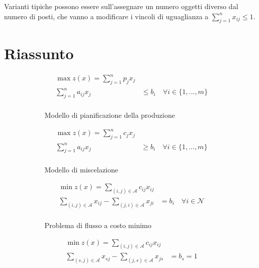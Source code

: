 \documentclass[\main/main.tex]{subfiles}
\begin{document}
Varianti tipiche possono essere sull'assegnare un numero oggetti diverso dal numero di posti, che vanno a modificare i vincoli di uguaglianza a $\sum_{j=1}^n x_{ij} \leq 1$.

\section{Riassunto}

\begin{figure}
	\begin{subfigure}{0.31\textwidth}
		\begin{align*}
			\max z(x) = \sum_{j=1}^n p_jx_j                                      \\
			\sum_{j=1}^n a_{ij}x_j & \leq b_i \quad \forall i \in \{1,\ldots,m\} \\
		\end{align*}
		\caption{Modello di pianificazione della produzione}
	\end{subfigure}
	\begin{subfigure}{0.31\textwidth}
		\begin{align*}
			\max z(x) = \sum_{j=1}^n c_jx_j                                      \\
			\sum_{j=1}^n a_{ij}x_j & \geq b_i \quad \forall i \in \{1,\ldots,m\} \\
		\end{align*}
		\caption{Modello di miscelazione}
	\end{subfigure}
	\begin{subfigure}{0.31\textwidth}
		\begin{align*}
			\min z(x) = \sum_{(i,j) \in \mathcal{A}} c_{ij}x_{ij}                                                             \\
			\sum_{(i,j) \in \mathcal{A}} x_{ij} - \sum_{(j,i) \in \mathcal{A}} x_{ji} & = b_i \quad \forall i \in \mathcal{N} \\
		\end{align*}
		\caption{Problema di flusso a costo minimo}
	\end{subfigure}
	\begin{subfigure}{0.31\textwidth}
		\begin{align*}
			\min z(x) = \sum_{(i,j) \in \mathcal{A}} c_{ij}x_{ij}                                                                 \\
			\sum_{(s,j) \in \mathcal{A}} x_{sj} - \sum_{(j,s) \in \mathcal{A}} x_{js} & = b_s = 1                                 \\

\end{align*}
\end{subfigure}
\end{figure}
\end{document}
